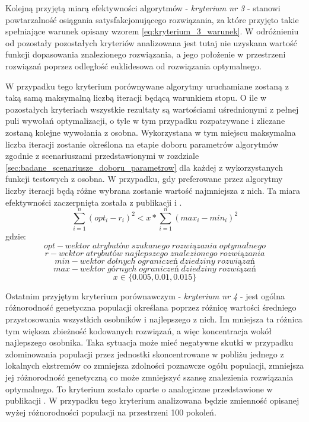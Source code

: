 \par 
Kolejną przyjętą miarą efektywności algorytmów - \emph{kryterium nr 3} - stanowi powtarzalność osiągania satysfakcjonującego rozwiązania, za które przyjęto takie spełniające warunek opisany wzorem \ref{eq:kryterium_3_warunek}. W odróżnieniu od pozostały pozostałych kryteriów analizowana jest tutaj nie uzyskana wartość funkcji dopasowania znalezionego rozwiązania, a jego położenie w przestrzeni rozwiązań poprzez odległość euklidesowa od rozwiązania optymalnego.
\par 
W przypadku tego kryterium porównywane algorytmy uruchamiane zostaną z taką samą maksymalną liczbą iteracji będącą warunkiem stopu. O ile w pozostałych kryteriach wszystkie rezultaty są wartościami uśrednionymi z pełnej puli wywołań optymalizacji, o tyle w tym przypadku rozpatrywane i zliczane zostaną kolejne wywołania z osobna. Wykorzystana w tym miejscu maksymalna liczba iteracji zostanie określona na etapie doboru parametrów algorytmów zgodnie z scenariuszami przedstawionymi w rozdziale \ref{sec:badane_scenariusze_doboru_parametrow} dla każdej z wykorzystanych funkcji testowych z osobna. W przypadku, gdy preferowane przez algorytmy liczby iteracji będą różne wybrana zostanie wartość najmniejsza z nich. Ta miara efektywności zaczerpnięta została z publikacji \cite{elbeltagi2005comparison} i \cite{mullen2014continuous}. 
\begin{equation} \label{eq:kryterium_3_warunek}
\sum_{i=1}^{n}\left(opt_i-r_i\right)^2 < x*\sum_{i=1}^{n}\left(max_i-min_i\right)^2
\end{equation}
gdzie:
\[opt - wektor\; atrybutów\; szukanego\; rozwiązania\; optymalnego\]
\[r - wektor\; atrybutów\; najlepszego\; znalezionego\; rozwiązania\]
\[min - wektor\; dolnych\; ograniczeń\; dziedziny\; rozwiązań\]
\[max - wektor\; górnych\; ograniczeń\; dziedziny\; rozwiązań\]
\[x \in \lbrace0.005, 0.01, 0.015\rbrace\]

\par 
Ostatnim przyjętym kryterium porównawczym - \emph{kryterium nr 4} - jest ogólna różnorodność genetyczna populacji określana poprzez różnicę wartości średniego przystosowania wszystkich osobników i najlepszego z nich. Im mniejsza ta różnica tym większa zbieżność kodowanych rozwiązań, a więc koncentracja wokół najlepszego osobnika. Taka sytuacja może mieć negatywne skutki w przypadku zdominowania populacji przez jednostki skoncentrowane w pobliżu jednego z lokalnych ekstremów co zmniejsza zdolności poznawcze ogółu populacji, zmniejsza jej różnorodność genetyczną co może zmniejszyć szansę znalezienia rozwiązania optymalnego. To kryterium zostało oparte o analogiczne przedstawione w publikacji \cite{ong2006classification}. W przypadku tego kryterium analizowana będzie zmienność opisanej wyżej różnorodności populacji na przestrzeni 100 pokoleń.



